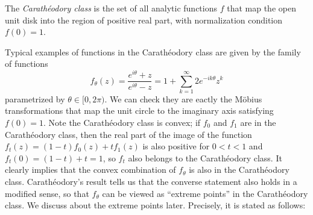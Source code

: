\documentclass[12pt]{article}
\begin{document}
\begin{defn}
The \emph{Carath\'eodory class} is the set of all analytic functions $f$ that map the open unit disk into the region of positive real part, with normalization condition $f(0)=1$.
\end{defn}


Typical examples of functions in the Carath\'eodory class are given by the family of functions
\[f_\theta(z)=\frac{e^{i\theta}+z}{e^{i\theta}-z}=1+\sum_{k=1}^\infty2e^{-ik\theta}z^k\]
parametrized by $\theta\in[0,2\pi)$.
We can check they are eactly the M\"obius transformations that map the unit circle to the imaginary axis satisfying $f(0)=1$.
Note the Carath\'eodory class is convex; if $f_0$ and $f_1$ are in the Carath\'eodory class, then the real part of the image of the function $f_t(z)=(1-t)f_0(z)+tf_1(z)$ is also positive for $0<t<1$ and $f_t(0)=(1-t)+t=1$, so $f_t$ also belongs to the Carath\'eodory class.
It clearly implies that the convex combination of $f_\theta$ is also in the Carath\'eodory class.
Carath\'eodory's result tells us that the converse statement also holds in a modified sense, so that $f_\theta$ can be viewed as ``extreme points'' in the Carath\'eodory class.
We discuss about the extreme points later.
Precisely, it is stated as follows:
\end{document}
